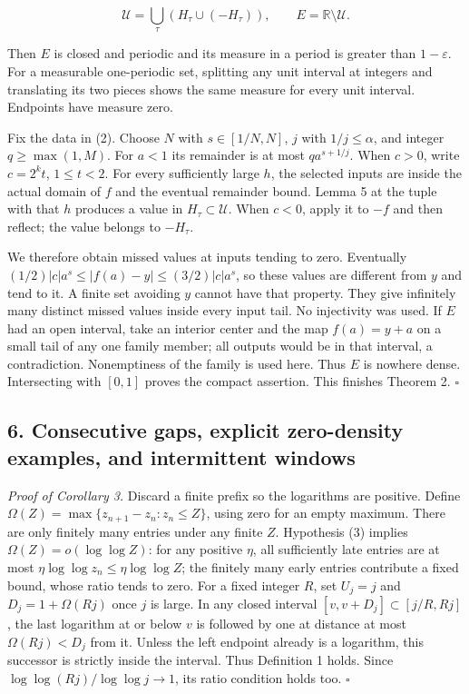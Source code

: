 \documentclass[
  11pt,
]{article}
\begin{document}
\[
 \mathcal U=\bigcup_\tau(H_\tau\cup(-H_\tau)),\qquad
 E=\mathbb R\setminus\mathcal U.                             \tag{26}
\]

Then \(E\) is closed and periodic and its measure in a period is greater
than \(1-\varepsilon\). For a measurable one-periodic set, splitting any
unit interval at integers and translating its two pieces shows the same
measure for every unit interval. Endpoints have measure zero.

Fix the data in (2). Choose \(N\) with \(s\in [1/N,N]\), \(j\) with
\(1/j\le \alpha\), and integer \(q\ge \max (1,M)\). For \(a<1\) its
remainder is at most \(q a^{s+1/j}\). When \(c>0\), write \(c=2^k t\),
\(1\le t<2\). For every sufficiently large \(h\), the selected inputs
are inside the actual domain of \(f\) and the eventual remainder bound.
Lemma 5 at the tuple with that \(h\) produces a value in
\(H_\tau \subset\mathcal U\). When \(c<0\), apply it to \(-f\) and then
reflect; the value belongs to \(-H_\tau\).

We therefore obtain missed values at inputs tending to zero. Eventually
\((1/2)|c|a^s\le |f(a)-y|\le (3/2)|c|a^s\), so these values are
different from \(y\) and tend to it. A finite set avoiding \(y\) cannot
have that property. They give infinitely many distinct missed values
inside every input tail. No injectivity was used. If \(E\) had an open
interval, take an interior center and the map \(f(a)=y+a\) on a small
tail of any one family member; all outputs would be in that interval, a
contradiction. Nonemptiness of the family is used here. Thus \(E\) is
nowhere dense. Intersecting with \([0,1]\) proves the compact assertion.
This finishes Theorem 2. \(\square\)

\subsection{6. Consecutive gaps, explicit zero-density examples, and
intermittent
windows}\label{consecutive-gaps-explicit-zero-density-examples-and-intermittent-windows}

\emph{Proof of Corollary 3.} Discard a finite prefix so the logarithms
are positive. Define \(\Omega (Z)=\max \{z_{n+1}-z_n:z_n\le Z\}\), using
zero for an empty maximum. There are only finitely many entries under
any finite \(Z\). Hypothesis (3) implies \(\Omega (Z)=o(\log\log  Z)\):
for any positive \(\eta\), all sufficiently late entries are at most
\(\eta  \log\log  z_n\le \eta  \log\log  Z\); the finitely many early
entries contribute a fixed bound, whose ratio tends to zero. For a fixed
integer \(R\), set \(U_j=j\) and \(D_j=1+\Omega (Rj)\) once \(j\) is
large. In any closed interval \([v,v+D_j]\subset [j/R,Rj]\), the last
logarithm at or below \(v\) is followed by one at distance at most
\(\Omega (Rj)<D_j\) from it. Unless the left endpoint already is a
logarithm, this successor is strictly inside the interval. Thus
Definition 1 holds. Since \(\log\log (Rj)/\log\log  j\to 1\), its ratio
condition holds too. \(\square\)
\end{document}
